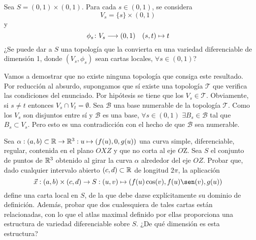 \documentclass[twoside]{article}
\newcommand{\T}{\mathcal{T}}
\begin{document}
\begin{ejercicio}{6}
Sea $S=(0,1)\times (0,1)$. Para cada $s\in(0,1)$, se considera
\[
V_s=\{s\}\times(0,1)
\]
y
\[
\phi_s\colon{V_s}\longrightarrow{(0,1)}\quad (s,t)\mapsto t
\]
¿Se puede dar a $S$ una topología que la convierta en una variedad diferenciable de dimensión 1, donde $(V_s, \phi_s)$ sean cartas locales, $\forall s\in (0, 1)$?
\begin{sol}
Vamos a demostrar que no existe ninguna topología que consiga este resultado. Por reducción al absurdo, supongamos que sí existe una topología $\mathcal{T}$ que verifica las condiciones del enunciado. Por hipótesis se tiene que los $V_s \in \T$. Obviamente, si $s\neq t$ entonces $V_s \cap V_t =\emptyset$. Sea $\mathcal{B}$ una base numerable de la topología $\T$. Como los $V_s$ son disjuntos entre sí y $\mathcal{B}$ es una base, $\forall s\in (0,1)$ $\exists B_s \in \mathcal{B}$ tal que $B_s\subset V_s$. Pero esto es una contradicción con el hecho de que $\mathcal{B}$ sea numerable.
\end{sol}
\end{ejercicio}
\newpage
\begin{ejercicio}{1.9}
Sea $\alpha : (a, b)\subset \mathbb{R}\to \mathbb{R}^3 : u \mapsto (f(u), 0, g(u))$ una curva
simple, diferenciable, regular, contenida en el plano $OXZ$ y que no corta al eje
$O$Z. Sea $S$ el conjunto de puntos de $\mathbb{R}^3$ obtenido al girar la curva $\alpha$ alrededor
del eje $OZ$. Probar que, dado cualquier intervalo abierto $(c, d) \subset \mathbb{R}$ de longitud
$2\pi$, la aplicación
$$\vec{x} : (a, b) \times (c, d) \to S : (u, v) \mapsto (f(u) \cos( v), f(u) \sen( v), g(u))$$
define una carta local en $S$, de la que debe darse explícitamente su dominio
de definición. Además, probar que dos cualesquiera de tales cartas están relacionadas, con lo que el atlas maximal definido por ellas proporciona una estructura de variedad diferenciable sobre $S$. ¿De qué dimensión es esta estructura?
\end{ejercicio}
\end{document}
